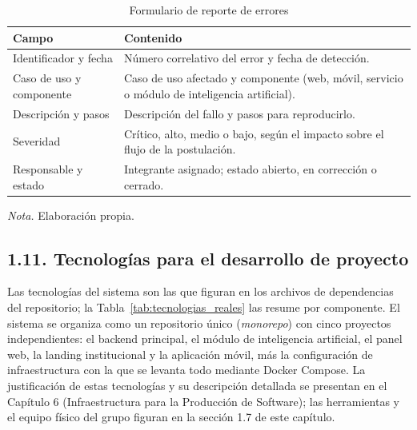 \begin{table}[H]
\caption{Formulario de reporte de errores}
\label{tab:form_errores}
\begin{threeparttable}
\begin{tabular}{>{\raggedright\arraybackslash}p{4cm} >{\raggedright\arraybackslash}p{9cm}}
\toprule
Campo & Contenido \\
\midrule
Identificador y fecha & Número correlativo del error y fecha de detección. \\
Caso de uso y componente & Caso de uso afectado y componente (web, móvil, servicio o módulo de inteligencia artificial). \\
Descripción y pasos & Descripción del fallo y pasos para reproducirlo. \\
Severidad & Crítico, alto, medio o bajo, según el impacto sobre el flujo de la postulación. \\
Responsable y estado & Integrante asignado; estado abierto, en corrección o cerrado. \\
\bottomrule
\end{tabular}
\begin{tablenotes}
\item \textit{Nota.} Elaboración propia.
\end{tablenotes}
\end{threeparttable}
\end{table}

\subsection{1.11. Tecnologías para el desarrollo de proyecto}

Las tecnologías del sistema son las que figuran en los archivos de dependencias del repositorio; la Tabla~\ref{tab:tecnologias_reales} las resume por componente. El sistema se organiza como un repositorio único (\textit{monorepo}) con cinco proyectos independientes: el backend principal, el módulo de inteligencia artificial, el panel web, la landing institucional y la aplicación móvil, más la configuración de infraestructura con la que se levanta todo mediante Docker Compose. La justificación de estas tecnologías y su descripción detallada se presentan en el Capítulo 6 (Infraestructura para la Producción de Software); las herramientas y el equipo físico del grupo figuran en la sección 1.7 de este capítulo.

